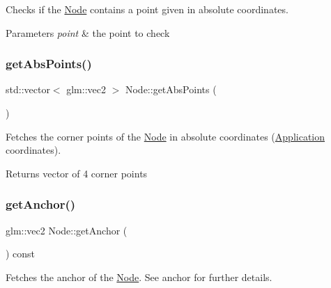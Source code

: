 Checks if the \mbox{\hyperlink{classsage_1_1Node}{Node}} contains a point given in absolute coordinates. 


\begin{DoxyParams}{Parameters}
{\em point} & the point to check \\
\hline
\end{DoxyParams}
\mbox{\label{classsage_1_1Node_af1dc65160a79ba86b10b08fd3eb28560}} 
\subsubsection{\texorpdfstring{getAbsPoints()}{getAbsPoints()}}
{\footnotesize\ttfamily std\+::vector$<$ glm\+::vec2 $>$ Node\+::get\+Abs\+Points (\begin{DoxyParamCaption}{ }\end{DoxyParamCaption})}



Fetches the corner points of the \mbox{\hyperlink{classsage_1_1Node}{Node}} in absolute coordinates (\mbox{\hyperlink{classsage_1_1Application}{Application}} coordinates). 

\begin{DoxyReturn}{Returns}
vector of 4 corner points 
\end{DoxyReturn}
\mbox{\label{classsage_1_1Node_a6733949b7b281d78a8bef8beafe1b630}} 
\subsubsection{\texorpdfstring{getAnchor()}{getAnchor()}}
{\footnotesize\ttfamily glm\+::vec2 Node\+::get\+Anchor (\begin{DoxyParamCaption}{ }\end{DoxyParamCaption}) const}



Fetches the anchor of the \mbox{\hyperlink{classsage_1_1Node}{Node}}. See anchor for further details. 


